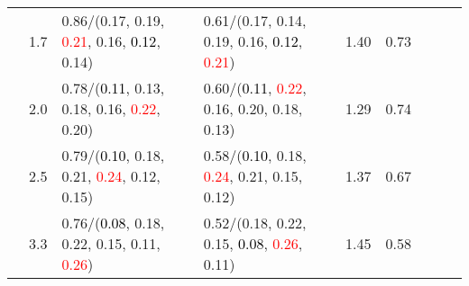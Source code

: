 \documentclass[10pt,a4paper]{report}
\begin{document}
\begin{table}[!htbp]
\begin{center}
{\begin{tabular}{ccllccccc}
				  & 1.7                               & 0.86/(0.17, 0.19, \textcolor{red}{0.21}, 0.16, \textcolor{black}{0.12}, 0.14)                                                                   & 0.61/(0.17, 0.14, 0.19, 0.16, \textcolor{black}{0.12}, \textcolor{red}{0.21})                                                                   & 1.40             & 0.73                     \\
				  & 2.0                               & 0.78/(\textcolor{black}{0.11}, 0.13, 0.18, 0.16, \textcolor{red}{0.22}, 0.20)                                                                   & 0.60/(\textcolor{black}{0.11}, \textcolor{red}{0.22}, 0.16, 0.20, 0.18, 0.13)                                                                   & 1.29             & 0.74                     \\
				  & 2.5                               & 0.79/(\textcolor{black}{0.10}, 0.18, 0.21, \textcolor{red}{0.24}, 0.12, 0.15)                                                                   & 0.58/(\textcolor{black}{0.10}, 0.18, \textcolor{red}{0.24}, 0.21, 0.15, 0.12)                                                                   & 1.37             & 0.67                     \\
				  & 3.3                               & 0.76/(\textcolor{black}{0.08}, 0.18, 0.22, 0.15, 0.11, \textcolor{red}{0.26})                                                                   & 0.52/(0.18, 0.22, 0.15, \textcolor{black}{0.08}, \textcolor{red}{0.26}, 0.11)                                                                   & 1.45             & 0.58                     \\
				\bottomrule
			\end{tabular}}
	\end{center}
\end{table}
\end{document}
